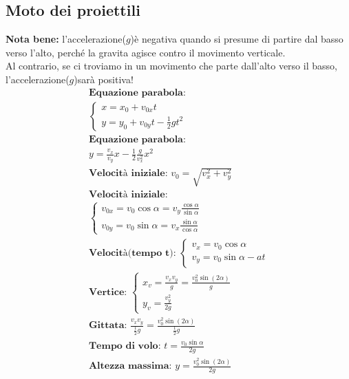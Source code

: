 \subsection{Moto dei proiettili}
\textbf{Nota bene: } l'accelerazione($g$)è negativa quando si presume di partire dal basso verso l'alto, perché la gravita agisce contro il movimento verticale. \\ Al contrario, se ci troviamo in un movimento che parte dall'alto verso il basso, l'accelerazione($g$)sarà positiva!
\begin{gather*}
    \textbf{Equazione parabola: } \\ \begin{cases}
        x = x_0 + v_{0x} t \\
        y = y_0 + v_{0y} t - \frac{1}{2} g t^2
    \end{cases}
    \\
    \textbf{Equazione parabola: } \\ y = \frac{v_x}{v_y} x - \frac{1}{2} \frac{g}{v_x^2} x^2 \\
    \textbf{Velocità iniziale: } v_0 = \sqrt{v_x^2 + v_y^2} \\
    \textbf{Velocità iniziale: } \\ \begin{cases}
        v_{0x} = v_0 \cos \alpha  = v_y \frac{\cos \alpha}{\sin \alpha} \\
        v_{0y} = v_0 \sin \alpha = v_x \frac{\sin \alpha }{\cos \alpha}
    \end{cases}
    \\
    \textbf{Velocità(tempo t): } \begin{cases}
        v_x = v_0 \cos \alpha \\
        v_y = v_0 \sin \alpha - a t
    \end{cases}
    \\
    \textbf{Vertice: } \begin{cases}
        x_v = \frac{v_x v_y}{g} = \frac{v_0^2 \sin (2\alpha)}{g} \\
        y_v = \frac{v_y^2}{2g}
    \end{cases}
    \\
    \textbf{Gittata: } \frac{v_x v_y}{\frac{1}{2}g} = \frac{v_0^2 \sin (2 \alpha)}{\frac{1}{2}g} \\
    \textbf{Tempo di volo: } t = \frac{v_0 \sin \alpha}{2g} \\
    \textbf{Altezza massima: } y = \frac{v_0^2 \sin (2 \alpha)}{2g}
\end{gather*}

